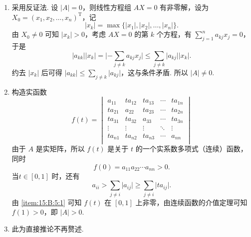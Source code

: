 \documentclass[12pt,fontset=fandol]{ctexart}
\begin{document}
\begin{solve}
\begin{enumerate}
                \item \label{item:15:B:5:1}
                      采用反证法. 设 $\lvert A \rvert = 0$，则线性方程组 $AX = 0$ 有非零解，设为 $X_0 = (x_1, x_2, \ldots, x_n)^{\mathrm{T}}$，记
                      \[\lvert x_k \rvert = \max \{\lvert x_1 \rvert, \lvert x_2 \rvert, \ldots, \lvert x_n \rvert\}.\]
                      由 $X_0 \neq 0$ 可知 $\lvert x_k \rvert > 0$，考虑 $AX = 0$ 的第 $k$ 个方程，有 $\displaystyle\sum_{j=1}^n a_{kj}x_j = 0$，于是
                      \[\lvert a_{kk} \rvert \lvert x_k \rvert = \lvert -\displaystyle\sum_{j \neq k}a_{kj}x_j \rvert \leqslant \sum_{j \neq k}\lvert a_{kj} \rvert \lvert x_k \rvert.\]
                      约去 $\lvert x_k \rvert$ 后可得 $\lvert a_{kk} \rvert \leqslant \displaystyle\sum_{j \neq k} \lvert a_{kj} \rvert$，这与条件矛盾. 所以 $\lvert A \rvert \neq 0$.

                \item 构造实函数
                      \[f(t) = \begin{vmatrix}
                              a_{11}  & ta_{12} & ta_{13} & \cdots & ta_{1n} \\
                              ta_{21} & a_{22}  & ta_{23} & \cdots & ta_{2n} \\
                              ta_{31} & ta_{32} & a_{33}  & \cdots & ta_{3n} \\
                              \vdots  & \vdots  & \vdots  & \ddots & \vdots  \\
                              ta_{n1} & ta_{n2} & ta_{n3} & \cdots & a_{nn}  \\
                          \end{vmatrix}\]
                      由于 $A$ 是实矩阵，所以 $f(t)$ 是关于 $t$ 的一个实系数多项式（连续）函数，同时
                      \[f(0) = a_{11}a_{22}\cdots a_{nn} > 0.\]
                      当$t \in [0, 1]$ 时，还有
                      \[a_{ii} > \sum_{j \neq i} \lvert a_{ij} \rvert \geqslant \sum_{j \neq i} \lvert ta_{ij} \rvert.\]
                      由 \eqref{item:15:B:5:1} 可知 $f(t)$ 在 $[0, 1]$ 上非零，由连续函数的介值定理可知 $f(1) > 0$，即 $\lvert A \rvert > 0$.

                \item 此为直接推论不再赘述.
            \end{enumerate}
\end{solve}
\end{document}
